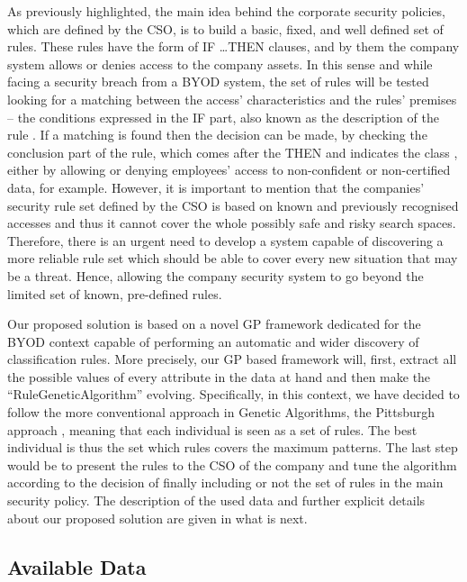 \documentclass[a4paper,10pt,twocolumn,preprint,3p]{elsarticle}
\begin{document}
As previously highlighted, the main idea behind the corporate security policies, which are defined by the CSO, is to build a basic, fixed, and well defined set of rules. These rules have the form of \textsc{IF \ldots THEN} clauses,  and by them the company system allows or denies access to the company assets. In this sense and while facing a security breach from a BYOD system, the set of rules will be tested looking for a matching between the access' characteristics and the rules' premises -- the conditions expressed in the IF part, also known as the description of the rule \cite{DeFalco2002257}. If a matching is found then the decision can be made, by checking the conclusion part of the rule, which comes after the THEN and indicates the class \cite{DeFalco2002257}, either by allowing or denying employees' access to non-confident or non-certified data, for example. However, it is important to mention that the companies' security rule set defined by the CSO is based on known and previously recognised accesses and thus it cannot cover the whole possibly safe and risky search spaces. Therefore, there is an urgent need to develop a system capable of discovering a more reliable rule set which should be able to cover every new situation that may be a threat. Hence, allowing the company security system to go beyond the limited set of known, pre-defined rules.

Our proposed solution is based on a novel GP framework dedicated for the BYOD context capable of performing an automatic and wider discovery of classification rules. More precisely, our GP based framework will, first, extract all the possible values of every attribute in the data at hand and then make the ``RuleGeneticAlgorithm'' evolving. %
Specifically, in this context, we have decided to follow the more conventional approach in Genetic Algorithms, the Pittsburgh approach \cite{freitas2002data}, meaning that each individual is seen as a set of rules. The best individual is thus the set which rules covers the maximum patterns. The last step would be to present the rules to the CSO of the company and tune the algorithm according to the decision of finally including or not the set of rules in the main security policy. The description of the used data and further explicit details about our proposed solution are given in what is next.

\subsection{Available Data}
\label{subsec:data}
\end{document}
